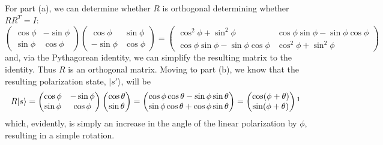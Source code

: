 \documentclass[12pt]{article}
\newenvironment{answer}
    {\begin{adjustwidth}{0pt}{0pt}}
    {\end{adjustwidth}}
\theoremstyle{remark}  %
\begin{document}
    \begin{answer}
        For part (a), we can determine whether $R$ is orthogonal determining whether $RR^T=I$: $$
            \begin{pmatrix}
                \cos\phi & -\sin\phi \\
                \sin\phi & \cos\phi
            \end{pmatrix}\begin{pmatrix}
                \cos\phi & \sin\phi \\
                -\sin\phi & \cos\phi
            \end{pmatrix} = \begin{pmatrix}
                \cos^2\phi + \sin^2\phi & \cos\phi\sin\phi - \sin\phi\cos\phi \\
                \cos\phi\sin\phi - \sin\phi\cos\phi & \cos^2\phi + \sin^2\phi
            \end{pmatrix}
        $$ and, via the Pythagorean identity, we can simplify the resulting matrix to the identity. Thus $R$ is an orthogonal matrix. Moving to part (b), we know that the resulting polarization state, $|s'\rangle$, will be $$
            R|s\rangle = \begin{pmatrix}
                \cos\phi & -\sin\phi \\
                \sin\phi & \cos\phi
            \end{pmatrix}\begin{pmatrix}
                \cos\theta \\
                \sin\theta
            \end{pmatrix} = \begin{pmatrix}
                \cos\phi\cos\theta - \sin\phi\sin\theta \\
                \sin\phi\cos\theta + \cos\phi\sin\theta
            \end{pmatrix} = \begin{pmatrix}
                \cos(\phi + \theta) \\
                \sin(\phi + \theta)
            \end{pmatrix}\footnotemark
        $$ which, evidently, is simply an increase in the angle of the linear polarization by $\phi$, resulting in a simple rotation.
    \end{answer}
\end{document}
